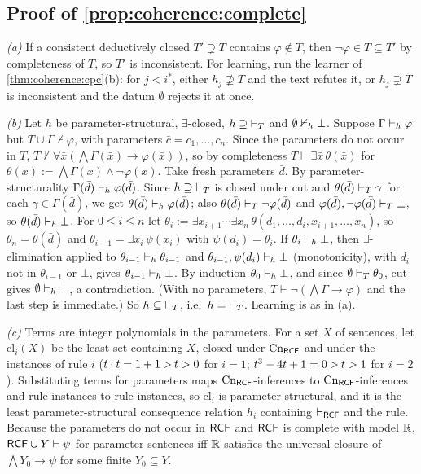 \subsection{Proof of \texorpdfstring{\cref{prop:coherence:complete}}{the complete-theories proposition}}\label{app:coherence:complete}

\emph{(a)} If a consistent deductively closed $T'\supsetneq T$ contains $\varphi\notin T$, then $\neg\varphi\in T\subseteq T'$ by completeness of $T$, so $T'$ is inconsistent. For learning, run the learner of \cref{thm:coherence:cpc}(b): for $j<i^*$, either $h_j\not\supseteq T$ and the text refutes it, or $h_j\supsetneq T$ is inconsistent and the datum $\emptyset$ rejects it at once.

\emph{(b)} Let $h$ be parameter-structural, $\exists$-closed, $h\supseteq{\vdash_T}$ and $\emptyset\nvdash_h\bot$. Suppose $\Gamma\vdash_h\varphi$ but $T\cup\Gamma\nvdash\varphi$, with parameters $\bar c=c_1,\dots,c_n$. Since the parameters do not occur in $T$, $T\nvdash\forall\bar x(\bigwedge\Gamma(\bar x)\to\varphi(\bar x))$, so by completeness $T\vdash\exists\bar x\,\theta(\bar x)$ for $\theta(\bar x):=\bigwedge\Gamma(\bar x)\wedge\neg\varphi(\bar x)$. Take fresh parameters $\bar d$. By parameter-structurality $\Gamma(\bar d)\vdash_h\varphi(\bar d)$. Since $h\supseteq{\vdash_T}$ is closed under cut and $\theta(\bar d)\vdash_T\gamma$ for each $\gamma\in\Gamma(\bar d)$, we get $\theta(\bar d)\vdash_h\varphi(\bar d)$; also $\theta(\bar d)\vdash_T\neg\varphi(\bar d)$ and $\varphi(\bar d),\neg\varphi(\bar d)\vdash_T\bot$, so $\theta(\bar d)\vdash_h\bot$. For $0\le i\le n$ let $\theta_i:=\exists x_{i+1}\cdots\exists x_n\,\theta(d_1,\dots,d_i,x_{i+1},\dots,x_n)$, so $\theta_n=\theta(\bar d)$ and $\theta_{i-1}=\exists x_i\,\psi(x_i)$ with $\psi(d_i)=\theta_i$. If $\theta_i\vdash_h\bot$, then $\exists$-elimination applied to $\theta_{i-1}\vdash_h\theta_{i-1}$ and $\theta_{i-1},\psi(d_i)\vdash_h\bot$ (monotonicity), with $d_i$ not in $\theta_{i-1}$ or $\bot$, gives $\theta_{i-1}\vdash_h\bot$. By induction $\theta_0\vdash_h\bot$, and since $\emptyset\vdash_T\theta_0$, cut gives $\emptyset\vdash_h\bot$, a contradiction. (With no parameters, $T\vdash\neg(\bigwedge\Gamma\to\varphi)$ and the last step is immediate.) So $h\subseteq{\vdash_T}$, i.e.\ $h={\vdash_T}$. Learning is as in (a).

\emph{(c)} Terms are integer polynomials in the parameters. For a set $X$ of sentences, let $\mathrm{cl}_i(X)$ be the least set containing $X$, closed under $\mathrm{Cn}_{\mathsf{RCF}}$ and under the instances of rule $i$ ($t\cdot t=1+1\rhd t>0$ for $i=1$; $t^3-4t+1=0\rhd t>1$ for $i=2$). Substituting terms for parameters maps $\mathrm{Cn}_{\mathsf{RCF}}$-inferences to $\mathrm{Cn}_{\mathsf{RCF}}$-inferences and rule instances to rule instances, so $\mathrm{cl}_i$ is parameter-structural, and it is the least parameter-structural consequence relation $h_i$ containing $\vdash_{\mathsf{RCF}}$ and the rule. Because the parameters do not occur in $\mathsf{RCF}$ and $\mathsf{RCF}$ is complete with model $\mathbb{R}$, $\mathsf{RCF}\cup Y\vdash\psi$ for parameter sentences iff $\mathbb{R}$ satisfies the universal closure of $\bigwedge Y_0\to\psi$ for some finite $Y_0\subseteq Y$.

